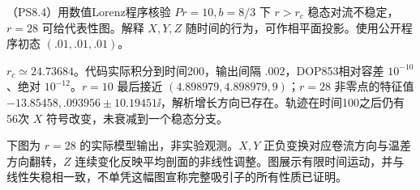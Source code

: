\begin{exercise}
（PS8.4）用数值Lorenz程序核验 $Pr=10,b=8/3$ 下 $r>r_c$ 稳态对流不稳定，$r=28$ 可给代表性图。解释 $X,Y,Z$ 随时间的行为，可作相平面投影。使用公开程序初态 $(.01,.01,.01)$。
\end{exercise}
\begin{solution}
$r_c\simeq24.73684$。代码实际积分到时间200，输出间隔 $.002$，DOP853相对容差 $10^{-10}$、绝对 $10^{-12}$。$r=10$ 最后接近 $(4.898979,4.898979,9)$；$r=28$ 非零点的特征值 $-13.85458,.093956\pm10.19451\ii$，解析增长方向已存在。轨迹在时间100之后仍有56次 $X$ 符号改变，未衰减到一个稳态分支。

下图为 $r=28$ 的实际模型输出，非实验观测。$X,Y$ 正负变换对应卷流方向与温差方向翻转，$Z$ 连续变化反映平均剖面的非线性调整。图展示有限时间运动，并与线性失稳相一致，不单凭这幅图宣称完整吸引子的所有性质已证明。
\begin{center}\par
{}\end{center}
\end{solution}
